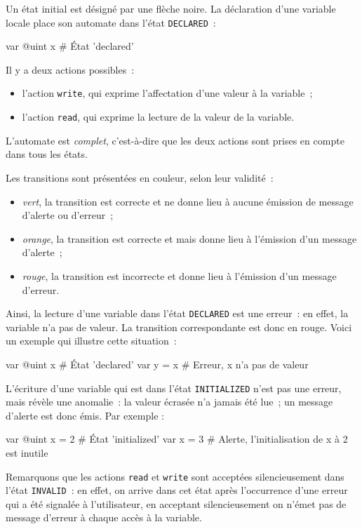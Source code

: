 Un état initial est désigné par une flèche noire. La déclaration d'une variable locale place son automate dans l'état \texttt{DECLARED}~:

\begin{galgas3}
var @uint x # État 'declared'
\end{galgas3}

Il y a deux actions possibles~:
\begin{itemize}
  \item l'action \texttt{write}, qui exprime l'affectation d'une valeur à la variable~;
  \item l'action \texttt{read}, qui exprime la lecture de la valeur de la variable.
\end{itemize}

L'automate est \emph{complet}, c'est-à-dire que les deux actions sont prises en compte dans tous les états.

Les transitions sont présentées en couleur, selon leur validité~:
\begin{itemize}
  \item \emph{vert}, la transition est correcte et ne donne lieu à aucune émission de message d'alerte ou d'erreur~;
  \item \emph{orange}, la transition est correcte et mais donne lieu à l'émission d'un message d'alerte~;
  \item \emph{rouge}, la transition est incorrecte et donne lieu à l'émission d'un message d'erreur.
\end{itemize}

Ainsi, la lecture d'une variable dans l'état \texttt{DECLARED} est une erreur~: en effet, la variable n'a pas de valeur. La transition correspondante est donc en rouge. Voici un exemple qui illustre cette situation~:
\begin{galgas3}
var @uint x # État 'declared'
var y = x # Erreur, x n'a pas de valeur
\end{galgas3}

L'écriture d'une variable qui est dans l'état \texttt{INITIALIZED} n'est pas une erreur, mais révèle une anomalie~: la valeur écrasée n'a jamais été lue~; un message d'alerte est donc émis. Par exemple :
\begin{galgas3}
var @uint x = 2 # État 'initialized'
var x = 3 # Alerte, l'initialisation de x à 2 est inutile
\end{galgas3}

Remarquons que les actions \texttt{read} et \texttt{write} sont acceptées silencieusement dans l'état \texttt{INVALID}~: en effet, on arrive dans cet état après l'occurrence d'une erreur qui a été signalée à l'utilisateur, en acceptant silencieusement on n'émet pas de message d'erreur à chaque accès à la variable.

